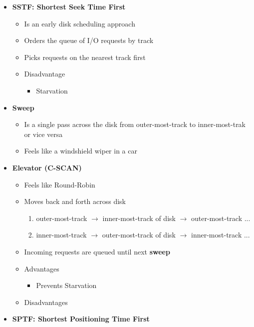 \documentclass[12pt]{article}
\begin{document}
\begin{itemize}
    \item \textbf{SSTF: Shortest Seek Time First}

    \begin{itemize}
        \item Is an early disk scheduling approach
        \item Orders the queue of I/O requests by track
        \item Picks requests on the nearest track first
        \item Disadvantage
        \begin{itemize}
            \item Starvation
        \end{itemize}
    \end{itemize}

    \item \textbf{Sweep}
    \begin{itemize}
        \item Is a single pass across the disk from outer-most-track to inner-most-trak or vice versa
        \item Feels like a windshield wiper in a car
    \end{itemize}

    \item \textbf{Elevator (C-SCAN)}

    \begin{itemize}
        \item Feels like Round-Robin
        \item Moves back and forth across disk
        \begin{enumerate}[1.]
            \item outer-most-track $\to$ inner-most-track of disk $\to$ outer-most-track ...
            \item inner-most-track  $\to$ outer-most-track of disk $\to$ inner-most-track ...
        \end{enumerate}
        \item Incoming requests are queued until next \textbf{sweep}
        \item Advantages
        \begin{itemize}
            \item Prevents Starvation
        \end{itemize}
        \item Disadvantages
    \end{itemize}

    \item \textbf{SPTF: Shortest Positioning Time First}


\end{itemize}
\end{document}
